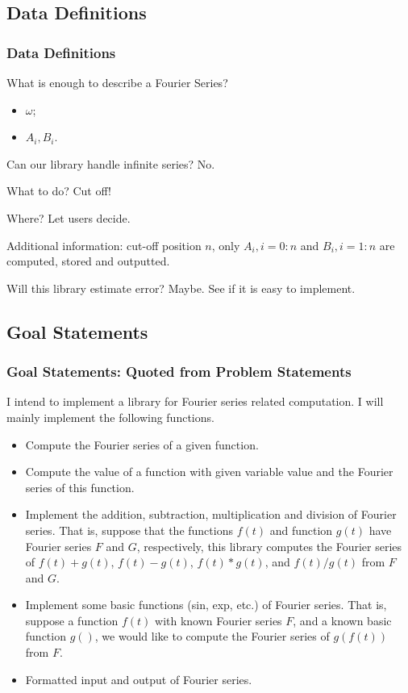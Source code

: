 \documentclass{beamer}
\begin{document}
	\subsection{Data Definitions}
	\begin{frame}
	\frametitle{Data Definitions}
	What is enough to describe a Fourier Series?
\begin{itemize}
	\item $\omega$;
	\item $A_i, B_i$.
\end{itemize}
Can our library handle infinite series? No.

What to do? Cut off!

Where? Let users decide.

Additional information: cut-off position $n$, only $A_i, i=0:n$ and $B_i, i=1:n$ are computed, stored and outputted.

Will this library estimate error? Maybe. See if it is easy to implement.
	\end{frame}

	\subsection{Goal Statements}
	\begin{frame}
		\frametitle{Goal Statements: Quoted from Problem Statements}
			I intend to implement a library for Fourier series related computation. I will mainly implement the following functions.
		\begin{itemize}
			\item Compute the Fourier series of a given function.
			\item Compute the value of a function with given variable value and the Fourier series of this function.
			\item Implement the addition, subtraction, multiplication and division of Fourier series. That is, suppose that the functions $f(t)$ and function $g(t)$ have Fourier series $F$ and $G$, respectively, this library computes the Fourier series of $f(t)+g(t)$, $f(t)-g(t)$, $f(t)*g(t)$, and $f(t)/g(t)$ from $F$ and $G$. 
			\item Implement some basic functions (sin, exp, etc.) of Fourier series. That is, suppose a function $f(t)$ with known Fourier series $F$, and a known basic function $g()$, we would like to compute the Fourier series of $g(f(t))$ from $F$. 
			\item Formatted input and output of Fourier series. 
		\end{itemize}
	\end{frame}
\end{document}
